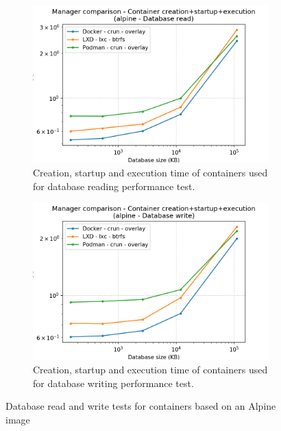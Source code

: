 \begin{figure}[h!]
    \begin{subfigure}{.5\textwidth}
      \centering
      \includegraphics[width=\linewidth]{images/manager/manager-full-alpine---Database-read.png}
      \caption{Creation, startup and execution time of containers used for database reading performance test.}
      \label{fig:manager:db-read-full}
    \end{subfigure}
    \begin{subfigure}{.5\textwidth}
      \centering
      \includegraphics[width=\linewidth]{images/manager/manager-full-alpine---Database-write.png}
      \caption{Creation, startup and execution time of containers used for database writing performance test.}
      \label{fig:manager:db-write-full}
    \end{subfigure}
    
    \caption{Database read and write tests for containers based on an Alpine image}
    \label{fig:manager:db}
\end{figure}

